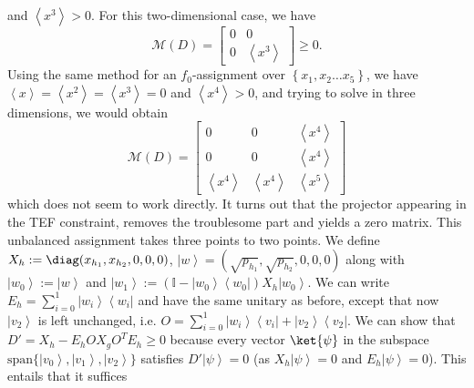 \documentclass{theoretics}
\begin{document}
and $\left\langle x^{3}\right\rangle >0$. For this two-dimensional case, we have
\begin{displaymath}
  \mathcal{M}(D)=\left[\begin{array}{cc}
      0 & 0                               \\
      0 & \left\langle x^{3}\right\rangle
    \end{array}\right]\ge0.
\end{displaymath}
Using the same method for an $f_{0}$-assignment
over $\left\{ x_{1},x_{2}\dots x_{5}\right\} $, we have $\left\langle x\right\rangle =\left\langle x^{2}\right\rangle =\left\langle x^{3}\right\rangle =0$
and $\left\langle x^{4}\right\rangle >0$, and trying to solve in three
dimensions, we would obtain
\begin{equation}
  \mathcal{M}(D)=\left[\begin{array}{ccc}
      0                               & 0                               & \left\langle x^{4}\right\rangle \\
      0                               & 0                               & \left\langle x^{4}\right\rangle \\
      \left\langle x^{4}\right\rangle & \left\langle x^{4}\right\rangle & \left\langle x^{5}\right\rangle
    \end{array}\right]\label{eq:exampleSubMatrix}
\end{equation}
which does not seem to work directly. It turns out that the projector
appearing in the TEF constraint, removes the troublesome
part and yields a zero matrix. This unbalanced assignment takes three points to
two points. We define $X_{h}:=\diag(x_{h_{1}},x_{h_{2}},0,0,0)$,
$\left|w\right\rangle =(\sqrt{p_{h_{1}}},\sqrt{p_{h_{2}}},0,0,0)$ along with $\left|w_{0}\right\rangle   :=\left|w\right\rangle$  and
$\left|w_{1}\right\rangle   :=\left(\mathbb{I}-\left|w_{0}\right\rangle \left\langle w_{0}\right|\right)X_{h}\left|w_{0}\right\rangle$. We can write $E_{h}=\sum_{i=0}^{1}\left|w_{i}\right\rangle \left\langle w_{i}\right|$
and have the same unitary as before, except that now $\left|v_{2}\right\rangle $ is left
unchanged, i.e. $O=\sum_{i=0}^{1}\left|w_{i}\right\rangle \left\langle v_{i}\right|+\left|v_{2}\right\rangle \left\langle v_{2}\right|$.
We can show that $D'=X_{h}-E_{h}OX_{g}O^{T}E_{h}\ge0$ because
every vector $\ket{\psi}$ in the subspace $\text{span}\{\left|v_{0}\right\rangle ,\left|v_{1}\right\rangle ,\left|v_{2}\right\rangle \}$
satisfies $D'\left|\psi\right\rangle =0$ (as $X_{h}\left|\psi\right\rangle =0$
and $E_{h}\left|\psi\right\rangle =0$). This entails that it suffices
\end{document}
